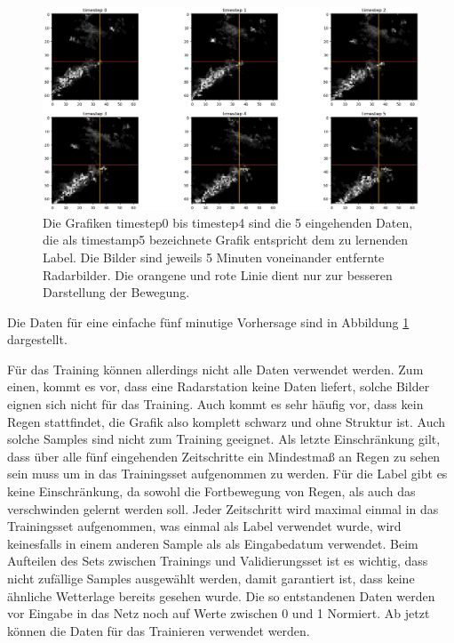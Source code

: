\begin{figure}[h]
	\includegraphics[width=\linewidth]{pics/5Daten_1Label_Radar.png}
	\caption[Beispielhaftes Trainingssample zur vorhersage von 5 Minuten]{Die Grafiken timestep0 bis timestep4 sind die 5 eingehenden Daten, die als timestamp5 bezeichnete Grafik entspricht dem zu lernenden Label. Die Bilder sind jeweils 5 Minuten voneinander entfernte Radarbilder. Die orangene und rote Linie dient nur zur besseren Darstellung der Bewegung.}
	\label{5D1L}
\end{figure}

Die Daten für eine einfache fünf minutige Vorhersage sind in Abbildung \ref{5D1L} dargestellt.

Für das Training können allerdings nicht alle Daten verwendet werden. Zum einen, kommt es vor, dass eine Radarstation keine Daten liefert, solche Bilder eignen sich nicht für das Training. Auch kommt es sehr häufig vor, dass kein Regen stattfindet, die Grafik also komplett schwarz und ohne Struktur ist. Auch solche Samples sind nicht zum Training geeignet. Als letzte Einschränkung gilt, dass über alle fünf eingehenden Zeitschritte ein Mindestmaß an Regen zu sehen sein muss um in das Trainingsset aufgenommen zu werden. Für die Label gibt es keine Einschränkung, da sowohl die Fortbewegung von Regen, als auch das verschwinden gelernt werden soll. Jeder Zeitschritt wird maximal einmal in das Trainingsset aufgenommen, was einmal als Label verwendet wurde, wird keinesfalls in einem anderen Sample als als Eingabedatum verwendet. Beim Aufteilen des Sets zwischen Trainings und Validierungsset ist es wichtig, dass nicht zufällige Samples ausgewählt werden, damit garantiert ist, dass keine ähnliche Wetterlage bereits gesehen wurde.
Die so entstandenen Daten werden vor Eingabe in das Netz noch auf Werte zwischen 0 und 1 Normiert. Ab jetzt können die Daten für das Trainieren verwendet werden.



